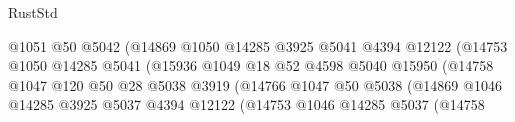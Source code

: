 \begin{lexlean}{RustStd}
\begin{coremodule}
                                              @1051
                                              @50
                                              @5042
                                              (@14869
                                                @1050
                                                @14285
                                                @3925
                                                @5041
                                                @4394
                                                @12122
                                                (@14753
                                                  @1050
                                                  @14285
                                                  @5041
                                                  (@15936
                                                    @1049
                                                    @18
                                                    @52
                                                    @4598
                                                    @5040
                                                    @15950
                                                    (@14758
                                                      @1047
                                                      @120
                                                      @50
                                                      @28
                                                      @5038
                                                      @3919
                                                      (@14766
                                                        @1047
                                                        @50
                                                        @5038
                                                        (@14869
                                                          @1046
                                                          @14285
                                                          @3925
                                                          @5037
                                                          @4394
                                                          @12122
                                                          (@14753
                                                            @1046
                                                            @14285
                                                            @5037
                                                            (@14758

\end{coremodule}
\end{lexlean}
